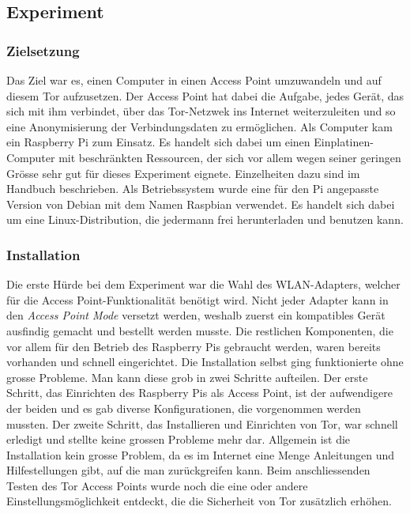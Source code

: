 \subsection{Experiment}

\subsubsection{Zielsetzung}
Das Ziel war es, einen Computer in einen Access Point umzuwandeln und auf diesem Tor aufzusetzen.
Der Access Point hat dabei die Aufgabe, jedes Gerät, das sich mit ihm verbindet, über das Tor-Netzwek ins Internet weiterzuleiten und so eine Anonymisierung der Verbindungsdaten zu ermöglichen.
Als Computer kam ein Raspberry Pi zum Einsatz.
Es handelt sich dabei um einen Einplatinen-Computer mit beschränkten Ressourcen, der sich vor allem wegen seiner geringen Grösse sehr gut für dieses Experiment eignete.
Einzelheiten dazu sind im Handbuch beschrieben.
Als Betriebssystem wurde eine für den Pi angepasste Version von Debian mit dem Namen Raspbian verwendet.
Es handelt sich dabei um eine Linux-Distribution, die jedermann frei herunterladen und benutzen kann.

\subsubsection{Installation}
Die erste Hürde bei dem Experiment war die Wahl des WLAN-Adapters, welcher für die Access Point-Funktionalität benötigt wird. Nicht jeder Adapter kann in den \textit{Access Point Mode} versetzt werden, weshalb zuerst ein kompatibles Gerät ausfindig gemacht und bestellt werden musste. Die restlichen Komponenten, die vor allem für den Betrieb des Raspberry Pis gebraucht werden, waren bereits vorhanden und schnell eingerichtet. Die Installation selbst ging funktionierte ohne grosse Probleme. Man kann diese grob in zwei Schritte aufteilen. Der erste Schritt, das Einrichten des Raspberry Pis als Access Point, ist der aufwendigere der beiden und es gab diverse Konfigurationen, die vorgenommen werden mussten. Der zweite Schritt, das Installieren und Einrichten von Tor, war schnell erledigt und stellte keine grossen Probleme mehr dar. Allgemein ist die Installation kein grosse Problem, da es im Internet eine Menge Anleitungen und Hilfestellungen gibt, auf die man zurückgreifen kann. Beim anschliessenden Testen des Tor Access Points wurde noch die eine oder andere Einstellungsmöglichkeit entdeckt, die die Sicherheit von Tor zusätzlich erhöhen.

